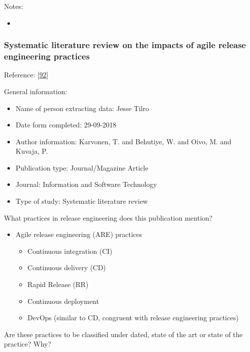 \documentclass[]{book}
\providecommand{\tightlist}{%
  \setlength{\itemsep}{0pt}\setlength{\parskip}{0pt}}
\begin{document}
Notes:

\begin{itemize}
\item
\end{itemize}

\subsubsection{Systematic literature review on the impacts of agile
release engineering
practices}\label{systematic-literature-review-on-the-impacts-of-agile-release-engineering-practices}

Reference: {[}\protect\hyperlink{ref-karvonen2017a}{92}{]}

General information:

\begin{itemize}
\tightlist
\item
  Name of person extracting data: Jesse Tilro
\item
  Date form completed: 29-09-2018
\item
  Author information: Karvonen, T. and Behutiye, W. and Oivo, M. and
  Kuvaja, P.
\item
  Publication type: Journal/Magazine Article
\item
  Journal: Information and Software Technology
\item
  Type of study: Systematic literature review
\end{itemize}

What practices in release engineering does this publication mention?

\begin{itemize}
\tightlist
\item
  Agile release engineering (ARE) practices

  \begin{itemize}
  \tightlist
  \item
    Continuous integration (CI)
  \item
    Continuous delivery (CD)
  \item
    Rapid Release (RR)
  \item
    Continuous deployment
  \item
    DevOps (similar to CD, congruent with release engineering practices)
  \end{itemize}
\end{itemize}

Are these practices to be classified under dated, state of the art or
state of the practice? Why?
\end{document}

